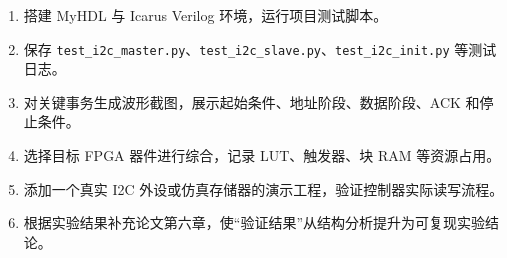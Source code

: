 \begin{enumerate}
\def\labelenumi{\arabic{enumi}.}
\tightlist
\item
  搭建 MyHDL 与 Icarus Verilog 环境，运行项目测试脚本。
\item
  保存 \texttt{test\_i2c\_master.py}、\texttt{test\_i2c\_slave.py}、\texttt{test\_i2c\_init.py} 等测试日志。
\item
  对关键事务生成波形截图，展示起始条件、地址阶段、数据阶段、ACK 和停止条件。
\item
  选择目标 FPGA 器件进行综合，记录 LUT、触发器、块 RAM 等资源占用。
\item
  添加一个真实 I2C 外设或仿真存储器的演示工程，验证控制器实际读写流程。
\item
  根据实验结果补充论文第六章，使``验证结果''从结构分析提升为可复现实验结论。
\end{enumerate}
